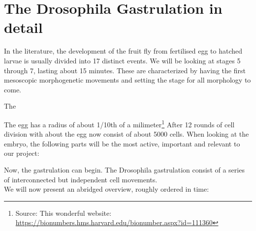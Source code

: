 



\newpage
\section{The Drosophila Gastrulation in detail}
In the literature, the development of the fruit fly from fertilised egg to hatched larvae is usually divided into 17 distinct events.\cite{bownes1975photographic} We will be looking at stages 5 through 7, lasting about 15 minutes. These are characterized by having the first mesoscopic morphogenetic movements and setting the stage for all morphology to come.

The

The egg has a radius of about 1/10th of a milimeter\footnote{Source: This wonderful website: \url{https://bionumbers.hms.harvard.edu/bionumber.aspx?id=111360}}
After 12 rounds of cell division with about the egg now consist of about 5000 cells. 
When looking at the embryo, the following parts will be the most active, important and relevant to our project:



Now, the gastrulation can begin.
The Drosophila gastrulation consist of a series of interconnected but independent cell movements.\\
We will now present an abridged overview, roughly ordered in time:





